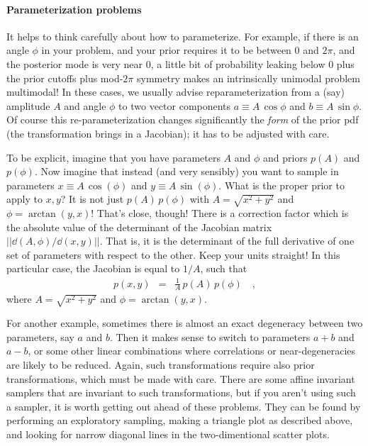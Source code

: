 \documentclass[modern]{aastex61}
\begin{document}
\paragraph{Parameterization problems}
It helps to think carefully about how to parameterize.
For example, if there is an angle $\phi$ in your problem,
  and your prior requires it to be between $0$ and $2\pi$,
  and the posterior mode is very near $0$,
  a little bit of probability leaking below $0$ plus the prior cutoffs plus mod-$2\pi$ symmetry
  makes an intrinsically unimodal problem multimodal!
In these cases, we usually advise reparameterization from a (say) amplitude $A$ and angle $\phi$
  to two vector components $a\equiv A\,\cos\phi$ and $b\equiv A\,\sin\phi$.
Of course this re-parameterization changes significantly the \emph{form} of the prior pdf
  (the transformation brings in a Jacobian);
  it has to be adjusted with care.

To be explicit, imagine that you have parameters $A$ and $\phi$ and
priors $p(A)$ and $p(\phi)$.
Now imagine that instead (and very sensibly) you want to sample in
parameters $x\equiv A\,\cos(\phi)$ and $y\equiv A\,\sin(\phi)$.
What is the proper prior to apply to $x, y$?
It is not just $p(A)\,p(\phi)$ with $A=\sqrt{x^2 + y^2}$ and $\phi=\arctan(y,x)$!
That's close, though! There is a correction factor which is the
absolute value of the determinant of the Jacobian matrix
$||{\dd(A,\phi)}/{\dd(x,y)}||$.
That is, it is the determinant of the full derivative of one set of
parameters with respect to the other.
Keep your units straight!
In this particular case, the Jacobian is equal to $1/A$, such that
\begin{eqnarray}
  p(x,y) &=& \frac{1}{A}\,p(A)\,p(\phi)
  \quad ,
\end{eqnarray}
where $A=\sqrt{x^2 + y^2}$ and $\phi=\arctan(y,x)$.

For another example, sometimes there is almost an exact degeneracy between two parameters,
  say $a$ and $b$.  Then it makes sense to switch to parameters $a+b$ and $a-b$,
  or some other linear combinations where correlations or near-degeneracies are likely to be reduced.
Again, such transformations require also prior transformations, which must be made with care.
There are some affine invariant samplers that are invariant to such
transformations, but if you aren't using such a sampler, it is worth
getting out ahead of these problems.
They can be found by performing an exploratory sampling,
  making a triangle plot as described above,
  and looking for narrow diagonal lines in the two-dimentional scatter plots.
\end{document}
